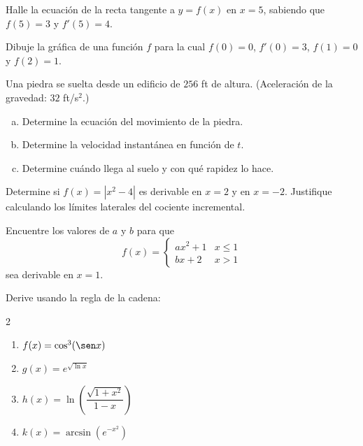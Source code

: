 \begin{prob}
Halle la ecuación de la recta tangente a $y = f(x)$ en $x = 5$,
sabiendo que $f(5) = 3$ y $f'(5) = 4$.
\end{prob}

\begin{prob}
Dibuje la gráfica de una función $f$ para la cual $f(0) = 0$,
$f'(0) = 3$, $f(1) = 0$ y $f(2) = 1$.
\end{prob}

\begin{prob}
Una piedra se suelta desde un edificio de $256$ ft de altura.
(Aceleración de la gravedad: $32$ ft/s$^2$.)
\begin{enumerate}[(a)]
    \item Determine la ecuación del movimiento de la piedra.
    \item Determine la velocidad instantánea en función de $t$.
    \item Determine cuándo llega al suelo y con qué rapidez lo hace.
\end{enumerate}
\end{prob}

\begin{prob}
Determine si $f(x) = |x^2-4|$ es derivable en $x=2$ y en $x=-2$.
Justifique calculando los límites laterales del cociente incremental.
\end{prob}

\begin{prob}
Encuentre los valores de $a$ y $b$ para que
\[
f(x) = \begin{cases} ax^2+1 & x\leq 1 \\ bx+2 & x>1 \end{cases}
\]
sea derivable en $x=1$.
\end{prob}

\begin{prob}
Derive usando la regla de la cadena:
\begin{multicols}{2}
\begin{enumerate}
    \item $f(x) = \cos^3(\sen x)$
    \item $g(x) = e^{\sqrt{\ln x}}$
    \item $h(x) = \ln\!\left(\dfrac{\sqrt{1+x^2}}{1-x}\right)$
    \item $k(x) = \arcsin(e^{-x^2})$
\end{enumerate}
\end{multicols}
\end{prob}

